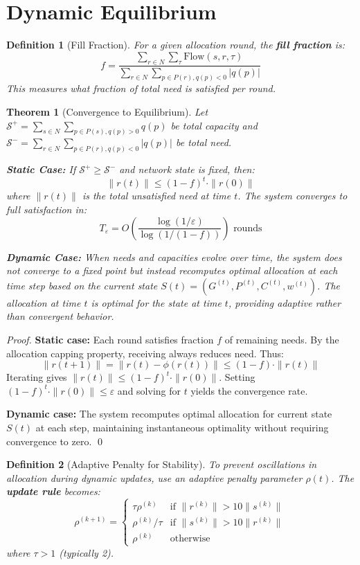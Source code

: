 \documentclass[11pt]{article}
\newtheorem{definition}{Definition}
\newtheorem{theorem}{Theorem}
\begin{document}
\section{Dynamic Equilibrium}

\begin{definition}[Fill Fraction]
For a given allocation round, the \textbf{fill fraction} is:
\[
f = \frac{\sum_{r \in N} \sum_{\tau} \text{Flow}(s, r, \tau)}{\sum_{r \in N} \sum_{p \in P(r), q(p) < 0} |q(p)|}
\]
This measures what fraction of total need is satisfied per round.
\end{definition}

\begin{theorem}[Convergence to Equilibrium]
Let $\mathcal{S}^+ = \sum_{s \in N} \sum_{p \in P(s), q(p) > 0} q(p)$ be total capacity and $\mathcal{S}^- = \sum_{r \in N} \sum_{p \in P(r), q(p) < 0} |q(p)|$ be total need.

\textbf{Static Case:} If $\mathcal{S}^+ \geq \mathcal{S}^-$ and network state is fixed, then:
\[
\|r(t)\| \leq (1-f)^t \cdot \|r(0)\|
\]
where $\|r(t)\|$ is the total unsatisfied need at time $t$. The system converges to full satisfaction in:
\[
T_\varepsilon = O\left(\frac{\log(1/\varepsilon)}{\log(1/(1-f))}\right) \text{ rounds}
\]

\textbf{Dynamic Case:} When needs and capacities evolve over time, the system does not converge to a fixed point but instead recomputes optimal allocation at each time step based on the current state $S(t) = (G^{(t)}, P^{(t)}, C^{(t)}, w^{(t)})$. The allocation at time $t$ is optimal for the state at time $t$, providing adaptive rather than convergent behavior.
\end{theorem}

\begin{proof}
\textbf{Static case:} Each round satisfies fraction $f$ of remaining needs. By the allocation capping property, receiving always reduces need. Thus:
\[
\|r(t+1)\| = \|r(t) - \phi(r(t))\| \leq (1-f) \cdot \|r(t)\|
\]
Iterating gives $\|r(t)\| \leq (1-f)^t \cdot \|r(0)\|$. Setting $(1-f)^t \cdot \|r(0)\| \leq \varepsilon$ and solving for $t$ yields the convergence rate.

\textbf{Dynamic case:} The system recomputes optimal allocation for current state $S(t)$ at each step, maintaining instantaneous optimality without requiring convergence to zero. \qed
\end{proof}

\begin{definition}[Adaptive Penalty for Stability]
To prevent oscillations in allocation during dynamic updates, use an adaptive penalty parameter $\rho(t)$. The \textbf{update rule} becomes:
\[
\rho^{(k+1)} = \begin{cases} 
\tau \rho^{(k)} & \text{if } \|r^{(k)}\| > 10 \|s^{(k)}\| \\
\rho^{(k)} / \tau & \text{if } \|s^{(k)}\| > 10 \|r^{(k)}\| \\
\rho^{(k)} & \text{otherwise}
\end{cases}
\]
where $\tau > 1$ (typically 2).
\end{definition}
\end{document}
